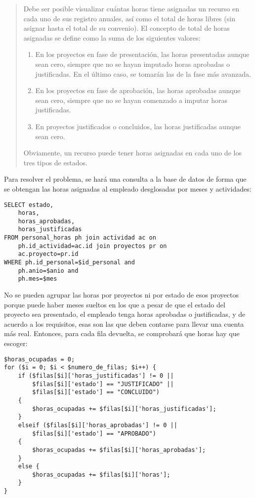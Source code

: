 \begin{quote}
Debe ser posible visualizar cuántas horas tiene asignadas un recurso en
cada uno de sus registro anuales, así como el total de horas libres (sin
asignar hasta el total de su convenio). El concepto de total de horas asignadas
se define como la suma de los siguientes valores:

\begin{enumerate}
\item En los proyectos en fase de presentación, las horas presentadas aunque
sean cero, siempre que no se hayan imputado horas aprobadas o justificadas. En
el último caso, se tomarán las de la fase más avanzada.

\item En los proyectos en fase de aprobación, las horas aprobadas aunque sean
cero, siempre que no se hayan comenzado a imputar horas justificadas.

\item En proyectos justificados o concluidos, las horas justificadas aunque
sean cero.
\end{enumerate}

Obviamente, un recurso puede tener horas asignadas en cada uno de los tres
tipos de estados.
\end{quote}

Para resolver el problema, se hará una consulta a la base de datos de forma que
se obtengan las horas asignadas al empleado desglosadas por meses y actividades:
\begin{lstlisting}
SELECT estado,
	horas,
	horas_aprobadas,
	horas_justificadas
FROM personal_horas ph join actividad ac on
	ph.id_actividad=ac.id join proyectos pr on
	ac.proyecto=pr.id
WHERE ph.id_personal=$id_personal and
	ph.anio=$anio and
	ph.mes=$mes
\end{lstlisting}

No se pueden agrupar las horas por proyectos ni por estado de esos
proyectos porque puede haber meses sueltos en los que a pesar de que el estado
del proyecto sea presentado, el empleado tenga horas aprobadas o justificadas, y
de acuerdo a los requisitos, esas son las que deben contarse para llevar una
cuenta más real. Entonces, para cada fila devuelta, se comprobará que horas hay
que escoger:

\begin{lstlisting}
$horas_ocupadas = 0;
for ($i = 0; $i < $numero_de_filas; $i++) {
	if ($filas[$i]['horas_justificadas'] != 0 ||
		$filas[$i]['estado'] == "JUSTIFICADO" ||
		$filas[$i]['estado'] == "CONCLUIDO")
	{
		$horas_ocupadas += $filas[$i]['horas_justificadas'];
	}
	elseif ($filas[$i]['horas_aprobadas'] != 0 ||
		$filas[$i]['estado'] == "APROBADO")
	{
		$horas_ocupadas += $filas[$i]['horas_aprobadas'];
	}
	else {
		$horas_ocupadas += $filas[$i]['horas'];
	}
}
\end{lstlisting}

